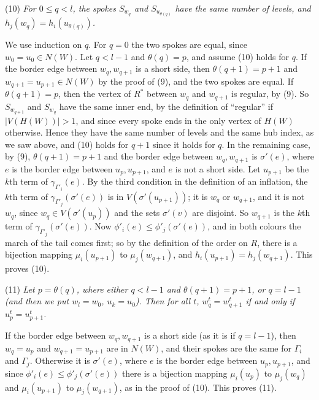 {\hspace*{12pt}(10) \textit{For $0 \le q < l$, the spokes $S_{w_q}$ and $S_{u_{\theta(q)}}$ have the same number of levels, and $h_j(w_q) = h_i(u_{\theta(q)})$.}

We use induction on $q$. For $q = 0$ the two spokes are equal, since $w_0 = u_0 \in N(W)$. Let $q < l-1$ and $\theta(q) = p$, and assume (10) holds for $q$. If the border edge between $w_q, w_{q+1}$ is a short side, then $\theta(q+1) = p+1$ and $w_{q+1} = u_{p+1} \in N(W)$ by the proof of (9), and the two spokes are equal. If $\theta(q+1) = p$, then the vertex of $R^*$ between $w_q$ and $w_{q+1}$ is regular, by (9). So $S_{w_{q+1}}$ and $S_{w_q}$ have the same inner end, by the definition of ``regular'' if $|V(H(W))| > 1$, and since every spoke ends in the only vertex of $H(W)$ otherwise. Hence they have the same number of levels and the same hub index, as we saw above, and (10) holds for $q+1$ since it holds for $q$. In the remaining case, by (9), $\theta(q+1) = p+1$ and the border edge between $w_q, w_{q+1}$ is $\sigma'(e)$, where $e$ is the border edge between $u_p, u_{p+1}$, and $e$ is not a short side. Let $u_{p+1}$ be the $k$th term of $\gamma_{\Gamma'_i}(e)$. By the third condition in the definition of an inflation, the $k$th term of $\gamma_{\Gamma'_j}(\sigma'(e))$ is in $V(\sigma'(u_{p+1}))$; it is $w_q$ or $w_{q+1}$, and it is not $w_q$, since $w_q \in V(\sigma'(u_p))$ and the sets $\sigma'(v)$ are disjoint. So $w_{q+1}$ is the $k$th term of $\gamma_{\Gamma'_j}(\sigma'(e))$. Now $\phi'_i(e) \le \phi'_j(\sigma'(e))$, and in both colours the march of the tail comes first; so by the definition of the order on $R$, there is a bijection mapping $\mu_i(u_{p+1})$ to $\mu_j(w_{q+1})$, and $h_i(u_{p+1}) = h_j(w_{q+1})$. This proves (10).

\hspace*{12pt}(11) \textit{Let $p = \theta(q)$, where either $q < l-1$ and $\theta(q+1) = p+1$, or $q = l-1$ (and then we put $w_l = w_0$, $u_k = u_0$). Then for all $t$, $w_q^t = w_{q+1}^t$ if and only if $u_p^t = u_{p+1}^t$.}

If the border edge between $w_q, w_{q+1}$ is a short side (as it is if $q = l-1$), then $w_q = u_p$ and $w_{q+1} = u_{p+1}$ are in $N(W)$, and their spokes are the same for $\Gamma_i$ and $\Gamma_j$. Otherwise it is $\sigma'(e)$, where $e$ is the border edge between $u_p, u_{p+1}$, and since $\phi'_i(e) \le \phi'_j(\sigma'(e))$ there is a bijection mapping $\mu_i(u_p)$ to $\mu_j(w_q)$ and $\mu_i(u_{p+1})$ to $\mu_j(w_{q+1})$, as in the proof of (10). This proves (11).

}
